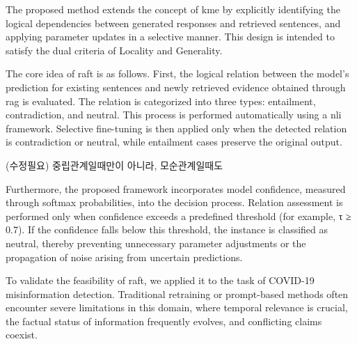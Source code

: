 \documentclass[a4paper,fleqn]{cas-sc}
\begin{document}
The proposed method extends the concept of \gls{kme} by explicitly identifying the logical dependencies between generated responses and retrieved sentences, and applying parameter updates in a selective manner. This design is intended to satisfy the dual criteria of Locality and Generality.

The core idea of \gls{raft} is as follows.
First, the logical relation between the model's prediction for existing sentences and newly retrieved evidence obtained through \gls{rag} is evaluated. The relation is categorized into three types: entailment, contradiction, and neutral. This process is performed automatically using a \gls{nli} framework.
Selective fine-tuning is then applied only when the detected relation is contradiction or neutral, while entailment cases preserve the original output.

(수정필요) 중립관계일때만이 아니라, 모순관계일때도 

Furthermore, the proposed framework incorporates model confidence, measured through softmax probabilities, into the decision process. Relation assessment is performed only when confidence exceeds a predefined threshold (for example, τ ≥ 0.7). If the confidence falls below this threshold, the instance is classified as neutral, thereby preventing unnecessary parameter adjustments or the propagation of noise arising from uncertain predictions.

To validate the feasibility of \gls{raft}, we applied it to the task of COVID-19 misinformation detection. Traditional retraining or prompt-based methods often encounter severe limitations in this domain, where temporal relevance is crucial, the factual status of information frequently evolves, and conflicting claims coexist.
\end{document}
